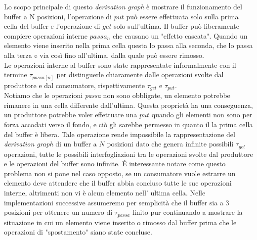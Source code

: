 \documentclass[a4paper]{article}
\begin{document}
Lo scopo principale di questo \textit{derivation graph} è mostrare il funzionamento del buffer a N posizioni, l'operazione di $put$ può essere effettuata solo sulla prima cella del buffer e l'operazione di $get$ solo sull'ultima.
Il buffer può liberamente compiere operazioni interne $passa_n$ che causano un "effetto cascata".
Quando un elemento viene inserito nella prima cella questa lo passa alla seconda, che lo passa alla terza e via così fino all'ultima, dalla quale può essere rimosso.\\
Le operazioni interne al buffer sono state rappresentate informalmente con il termine $\tau_{passa[n]}$ per distinguerle chiaramente dalle operazioni svolte dal produttore e dal consumatore, rispettivamente $\tau_{get}$ e $\tau_{put}$.\\
Notiamo che le operazioni \textit{passa} non sono obbligate, un elemento potrebbe rimanere in una cella differente dall'ultima.
Questa proprietà ha una conseguenza, un produttore potrebbe voler effettuare una $put$ quando gli elementi non sono per forza accodati verso il fondo, e ciò gli sarebbe permesso in quanto il la prima cella del buffer è libera.
Tale operazione rende impossibile la rappresentazione del \textit{derivation graph} di un buffer a $N$ posizioni dato che genera infinite possibili $\tau_{get}$ operazioni, tutte le possibili interfogliazioni tra le operazioni svolte dal produttore e le operazioni del buffer sono infinite.
É interessante notare come questo problema non si pone nel caso opposto, se un consumatore vuole estrarre un elemento deve attendere che il buffer abbia concluso tutte le sue operazioni interne, altrimenti non vi è alcun elemento nell' ultima cella.
Nelle implementazioni successive assumeremo per semplicità che il buffer sia a 3 posizioni per ottenere un numero di $\tau_{passa}$ finito pur continuando a mostrare la situazione in cui un elemento viene inserito o rimosso dal buffer prima che le operazioni di "spostamento" siano state concluse.
\end{document}
